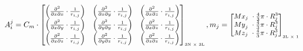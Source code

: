 \begin{equation} \label{eq:sphere4}
\small A_i^j ={C}_{m} \cdot \left[\begin{matrix}\left(\frac{\partial^2}{\partial x\partial x}\cdot\frac{1}{r_{i,j}}\right)&\left(\frac{\partial^2}{\partial x\partial y}\cdot\frac{1}{r_{i,j}}\right)&\left(\frac{\partial^2}{\partial x\partial z}\cdot\frac{1}{r_{i,j}}\right)\\\left(\frac{\partial^2}{\partial x\partial y}\cdot\frac{1}{r_{i,j}}\right)&\left(\frac{\partial^2}{\partial y\partial y}\cdot\frac{1}{r_{i,j}}\right)&\left(\frac{\partial^2}{\partial x\partial z}\cdot\frac{1}{r_{i,j}}\right)\\\left(\frac{\partial^2}{\partial x\partial z}\cdot\frac{1}{r_{i,j}}\right)&\left(\frac{\partial^2}{\partial y\partial z}\cdot\frac{1}{r_{i,j}}\right)&\left(\frac{\partial^2}{\partial z\partial z}\cdot\frac{1}{r_{i,j}}\right)\\\end{matrix}\right]_{\text{\tiny 3N $\times$ 3L}},
m_j =\left[\begin{matrix}{{Mx}_{j\ }} \cdot \frac{4}{3}\pi\cdot R_j^3\\{{My}_{j\ }} \cdot \frac{4}{3}\pi\cdot R_j^3\\{{Mz}_{j\ }} \cdot \frac{4}{3}\pi\cdot R_j^3\\\end{matrix}\right]_{\text{\tiny 3L $\times$ 1}}
\end{equation}

\begin{FlushRight}
\end{FlushRight}


